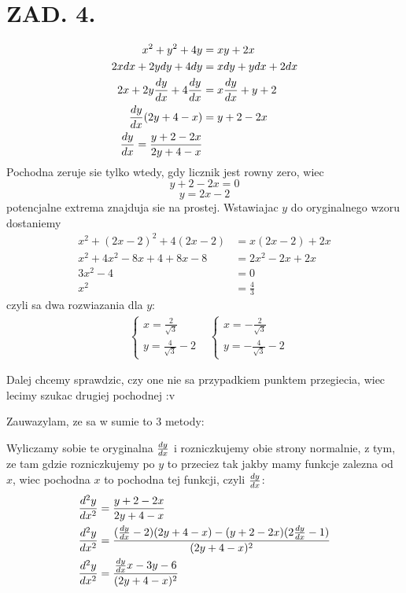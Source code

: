 \documentclass{article}[13pt]
\begin{document}
    \section*{ZAD. 4.}

    \begin{align*}
        x^2+y^2+4y&=xy+2x\\
        2xdx+2ydy+4dy&=xdy+ydx+2dx\\
        2x+2y{dy\over dx}+4{dy\over dx}&=x{dy\over dx}+y+2\\
        {dy\over dx}(2y+4-x)&=y+2-2x\\
        {dy\over dx}={y+2-2x\over 2y+4-x}
    \end{align*}
    Pochodna zeruje sie tylko wtedy, gdy licznik jest rowny zero, wiec
    $$y+2-2x=0$$
    $$y=2x-2$$
    potencjalne extrema znajduja sie na prostej. Wstawiajac $y$ do oryginalnego wzoru dostaniemy
    \begin{align*}
        x^2+(2x-2)^2+4(2x-2)&=x(2x-2)+2x\\
        x^2+4x^2-8x+4+8x-8&=2x^2-2x+2x\\
        3x^2-4&=0\\
        x^2&=\frac43
    \end{align*}
    czyli sa dwa rozwiazania dla $y$:
    \begin{align*}
        &\begin{cases}
            x=\frac2{\sqrt3}\\
            y=\frac4{\sqrt3}-2
        \end{cases}
        &\begin{cases}
            x=-\frac2{\sqrt3}\\
            y=-\frac4{\sqrt3}-2
        \end{cases}
    \end{align*}

    Dalej chcemy sprawdzic, czy one nie sa przypadkiem punktem przegiecia, wiec lecimy szukac drugiej pochodnej :v

    Zauwazylam, ze sa w sumie to 3 metody:\medskip

    Wyliczamy sobie te oryginalna ${dy\over dx}$ i rozniczkujemy obie strony normalnie, z tym, ze tam gdzie rozniczkujemy po $y$ to przeciez tak jakby mamy funkcje zalezna od $x$, wiec pochodna $x$ to pochodna tej funkcji, czyli ${dy\over dx}$:
    \begin{align*}
        {d^2y\over dx^2}&={y+2-2x\over 2y+4-x}\\
        {d^2y\over dx^2}&={({dy\over dx}-2)(2y+4-x)-(y+2-2x)(2{dy\over dx}-1)\over(2y+4-x)^2}\\
        {d^2y\over dx^2}&={{dy\over dx}x-3y-6\over (2y+4-x)^2}
    \end{align*}
\end{document}
